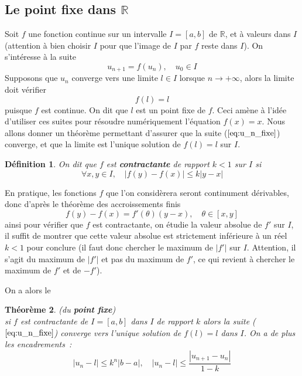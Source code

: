 \documentclass[a4paper,11pt]{article}
\newtheorem{thm}{Théorème}
\newtheorem{defn}[thm]{D\'efinition}
\begin{document}
\begin{giacjshere}
\subsection{Le point fixe dans $\mathbb{R}$} 
Soit $f$ une fonction continue sur un intervalle $I=[a,b]$ de $\mathbb{R}$, et 
à valeurs dans $I$ (attention à bien choisir $I$ pour que l'image
de $I$ par $f$ reste dans $I$).
On s'intéresse à la suite 
\begin{equation} \label{eq:u_n_fixe}
 u_{n+1}=f(u_n), \quad u_0 \in I 
\end{equation}
Supposons que $u_n$ converge vers une limite $l \in I$ lorsque
$n \rightarrow +\infty$, alors la limite doit vérifier
\[ f(l)=l \]
puisque $f$ est continue. On dit que $l$ est un point fixe de $f$.
Ceci amène à l'idée d'utiliser ces suites pour résoudre numériquement
l'équation $f(x)=x$. Nous allons donner un théorème permettant
d'assurer que la suite (\(\ref{eq:u_n_fixe}\)) converge, et que la limite
est l'unique solution de $f(l)=l$ sur $I$.

\begin{defn}
On dit que $f$ est {\bf contractante} de rapport $k<1$ sur $I$ si
\[ \forall x,y \in I, \quad |f(y)-f(x)| \leq k |y-x| \]
\end{defn}

En pratique, les fonctions $f$ que l'on considèrera seront continument
dérivables, donc d'après le théorème des accroissements finis
\[ f(y)-f(x)=f'(\theta) (y-x), \quad \theta \in [x,y] \]
ainsi pour vérifier que $f$ est contractante, on étudie la valeur absolue
de $f'$ sur $I$, il suffit de montrer que cette valeur absolue
est strictement inférieure à un réel $k<1$ pour conclure (il faut
donc chercher le maximum de $|f'|$ sur $I$. Attention, il s'agit du
maximum de $|f'|$ et pas du maximum de $f'$, ce qui revient à chercher
le maximum de $f'$ et de $-f'$).

On a alors le 
\begin{thm} (du {\bf point fixe})\\
si $f$ est contractante de $I=[a,b]$
dans $I$ de rapport $k$ 
alors la suite (\(\ref{eq:u_n_fixe}\)) converge vers l'unique
solution de $f(l)=l$ dans $I$. On a de plus les encadrements~:
\begin{equation}  \label{eq:u_n_l}
|u_n-l| \leq k^n |b-a|, \quad
|u_n -l | \leq \frac{|u_{n+1}-u_n|}{1-k} 
\end{equation}
\end{thm}


\end{giacjshere}
\end{document}
